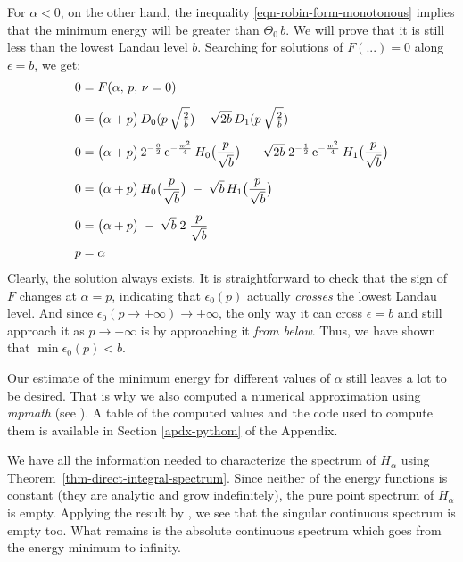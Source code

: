 For $\alpha < 0$, on the other hand, the inequality \eqref{eqn-robin-form-monotonous} implies that the minimum energy will be greater than $\Theta_0 \, b$. We will prove that it is still less than the lowest Landau level $b$. Searching for solutions of $F(...) = 0$ along $\epsilon = b$, we get:
\begin{align*}
    0 &=
    F(\alpha, \, p, \, \nu = 0)
    \\[5pt]
    0 &=
    \big( \alpha + p\big) \,
    D_0(p \, \sqrt{\tfrac{2}{b}})
    - \sqrt{2b} \,
    D_1(p \, \sqrt{\tfrac{2}{b}})
    \\[5pt]
    0 &=
    \big( \alpha + p\big) \,
    2^{-\frac{0}{2}} \,
    \mathrm{e}^{-\frac{w^2}{4}} \,
    H_0\big( \frac{p}{\sqrt{b}} \big)
    \; - \;
    \sqrt{2b} \;
    2^{-\frac{1}{2}} \,
    \mathrm{e}^{-\frac{w^2}{4}} \,
    H_1\big( \frac{p}{\sqrt{b}} \big)
    \\[5pt]
    0 &=
    \big( \alpha + p\big) \,
    H_0\big( \frac{p}{\sqrt{b}} \big)
    \; - \;
    \sqrt{b} \,
    H_1\big( \frac{p}{\sqrt{b}} \big)
    \\[5pt]
    0 &=
    \big( \alpha + p\big)
    \; - \;
    \sqrt{b} \;
    2 \; \frac{p}{\sqrt{b}}
    \\
    p &= \alpha
\end{align*}
Clearly, the solution always exists. It is straightforward to check that the sign of $F$ changes at $\alpha=p$, indicating that $\epsilon_0(p)$ actually \textit{crosses} the lowest Landau level. And since $\epsilon_0(p \to +\infty) \to +\infty$, the only way it can cross $\epsilon = b$ and still approach it as $p\to -\infty$ is by approaching it \textit{from below}. Thus, we have shown that $\min \epsilon_0(p) < b$.

Our estimate of the minimum energy for different values of $\alpha$ still leaves a lot to be desired. That is why we also computed a numerical approximation using \textit{mpmath} (see \cite{mpmath}). A table of the computed values and the code used to compute them is available in Section \ref{apdx-pythom} of the Appendix.

We have all the information needed to characterize the spectrum of $H_\alpha$ using Theorem~\ref{thm-direct-integral-spectrum}. Since neither of the energy functions is constant (they are analytic and grow indefinitely), the pure point spectrum of $H_\alpha$ is empty. Applying the result by \cite{Filonov2006}, we see that the singular continuous spectrum is empty too. What remains is the absolute continuous spectrum which goes from the energy minimum to infinity.

